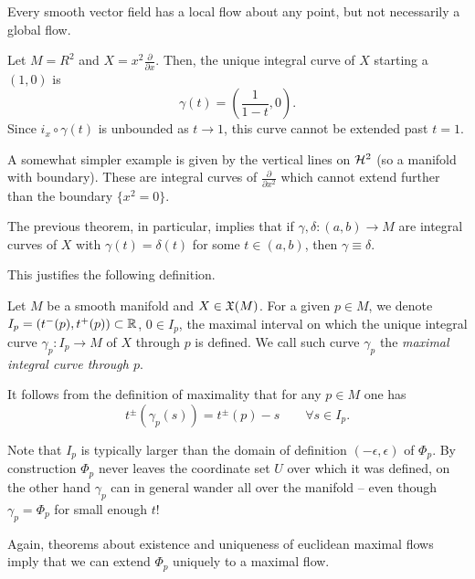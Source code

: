 Every smooth vector field has a local flow about any point, but not necessarily a global flow.
\begin{example}\label{ex:non-complete}
  Let $M = R^2$ and $X = x^2 \frac{\partial}{\partial x}$.
  Then, the unique integral curve of $X$ starting a $(1,0)$ is
  \begin{equation}
    \gamma(t) = \left(\frac{1}{1-t}, 0\right).
  \end{equation}
  Since $i_x \circ \gamma(t)$ is unbounded as $t\to 1$, this curve cannot be extended past $t=1$.

  A somewhat simpler example is given by the vertical lines on $\mathcal{H}^2$ (so a manifold with boundary). These are integral curves of $\frac{\partial}{\partial x^2}$ which cannot extend further than the boundary $\{x^2=0\}$.
\end{example}

The previous theorem, in particular, implies that if $\gamma, \delta : (a,b)\to M$ are integral curves of $X$ with $\gamma(t) = \delta(t)$ for some $t \in(a,b)$, then $\gamma\equiv\delta$.

This justifies the following definition.
\begin{definition}
  Let $M$ be a smooth manifold and $X\in\mathfrak{X}(M)$.
  For a given $p\in M$, we denote $I_p = \left(t^-(p), t^+(p)\right) \subset\mathbb{R}$, $0 \in I_p$, the maximal interval on which the unique integral curve $\gamma_p : I_p \to M$ of $X$ through $p$ is defined.
  We call such curve $\gamma_p$ the \emph{maximal integral curve through $p$}.
\end{definition}

\begin{remark}
  It follows from the definition of maximality that for any $p\in M$ one has
  \begin{equation}
    t^{\pm}(\gamma_p(s)) = t^\pm(p) - s \qquad \forall s\in I_p.
  \end{equation}
\end{remark}

Note that $I_p$ is typically larger than the domain of definition $(-\epsilon, \epsilon)$ of $\Phi_p$. By construction $\Phi_p$ never leaves the coordinate set $U$ over which it was defined, on the other hand $\gamma_p$ can in general wander all over the manifold -- even though $\gamma_p = \Phi_p$ for small enough $t$!

Again, theorems about existence and uniqueness of euclidean maximal flows imply that we can extend $\Phi_p$ uniquely to a maximal flow.


